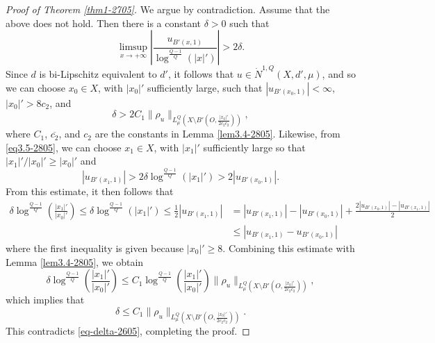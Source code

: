 \documentclass[10pt]{amsart}
\numberwithin{equation}{section}
\begin{document}
\begin{proof}[Proof of Theorem \ref{thm1-2705}]
  We argue by  contradiction. Assume that the above does not hold.  Then there is a constant $\delta>0$ such that
	\begin{equation}\label{eq3.5-2805}
		\limsup_{x\to{+\infty}}\left| \frac{u_{B'(x,1)}}{\log^{\frac{Q-1}{Q}}(|x|')} \right|>2\delta.
	\end{equation}
	Since $d$ is bi-Lipschitz equivalent to $d'$, it follows that  $u\in\dot N^{1,Q}(X,d',\mu)$, and so we can choose $x_0\in X$, with $|x_0|'$ sufficiently large, such that $|u_{B'(x_0,1)}|<\infty$, $|x_0|'> 8c_2$, and 
	\begin{equation}\label{eq-delta-2605}
		\delta > 2 C_{1} \|\rho_u\|_{L^Q_\mu\left(X\setminus B'\left(O,\frac{|x_0|'}{2\overline{c_2}c_2}\right)\right)},
	\end{equation}
	where $C_1$, $\overline{c_2}$, and $c_2$ are the constants in Lemma \ref{lem3.4-2805}.
	Likewise, from \eqref{eq3.5-2805}, we can choose $x_1\in X$, with $|x_1|'$ sufficiently large so that $|x_1|'/|x_0|'\ge|x_0|'$ and 
	\begin{equation}\label{eq3-2605}
		|u_{B'(x_1,1)}|>2\delta \log^{\frac{Q-1}{Q}}(|x_1|')>2 |u_{B'(x_0,1)}|.
	\end{equation}
From this estimate, it then follows that
	\begin{align*}
		\delta \log^{\frac{Q-1}{Q}}\left(\frac{|x_1|'}{|x_0|'} \right) \leq  \delta \log^{\frac{Q-1}{Q}}(|x_1|')\leq \frac{1}{2}|u_{B'(x_1,1)}|&=|u_{B'(x_1,1)}|-|u_{B'(x_0,1)}|+ \frac{2|u_{B'(x_0,1)}|-|u_{B'(x_1,1)}|}{2}\\
		&\leq  |u_{B'(x_1,1)}- u_{B'(x_0,1)}|
	\end{align*}
where the first inequality is given because $|x_0|'\ge 8$. Combining this estimate with Lemma \ref{lem3.4-2805}, we obtain 
	\[
		\delta \log^{\frac{Q-1}{Q}}\left(\frac{|x_1|'}{|x_0|'} \right) \leq  C_1 \log^{\frac{Q-1}{Q}}\left(\frac{|x_1|'}{|x_0|'} \right)  \|\rho_u\|_{L^Q_\mu\left(X\setminus B'\left(O,\frac{|x_0|'}{2\overline{c_2}c_2} \right)\right)},
	\]
	which implies that
	\[
	\delta \leq  C_1  \|\rho_u\|_{L^Q_\mu\left(X\setminus B'\left(O,\frac{|x_0|'}{2\overline{c_2}c_2} \right)\right)}.
	\]
This contradicts \eqref{eq-delta-2605}, completing the proof. 
 \end{proof}
\end{document}
